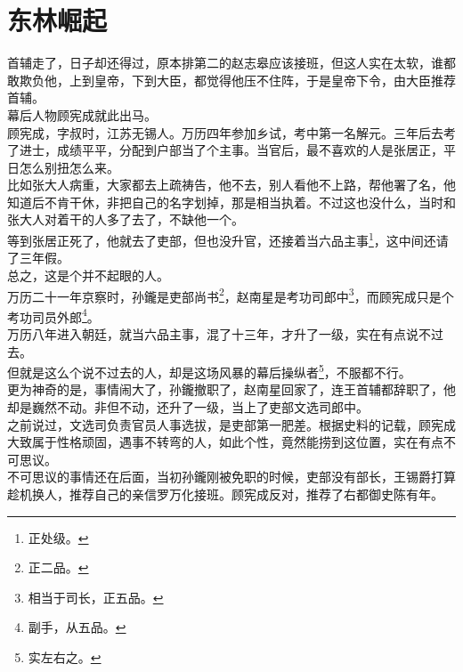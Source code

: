 \section{东林崛起}
\ifnum{}
	\begin{multicols}{\theparacolNo}
\fi
首辅走了，日子却还得过，原本排第二的赵志皋应该接班，但这人实在太软，谁都敢欺负他，上到皇帝，下到大臣，都觉得他压不住阵，于是皇帝下令，由大臣推荐首辅。\\

幕后人物顾宪成就此出马。\\

顾宪成，字叔时，江苏无锡人。万历四年参加乡试，考中第一名解元。三年后去考了进士，成绩平平，分配到户部当了个主事。当官后，最不喜欢的人是张居正，平日怎么别扭怎么来。\\

比如张大人病重，大家都去上疏祷告，他不去，别人看他不上路，帮他署了名，他知道后不肯干休，非把自己的名字划掉，那是相当执着。不过这也没什么，当时和张大人对着干的人多了去了，不缺他一个。\\

等到张居正死了，他就去了吏部，但也没升官，还接着当六品主事\footnote{正处级。}，这中间还请了三年假。\\

总之，这是个并不起眼的人。\\

万历二十一年京察时，孙鑨是吏部尚书\footnote{正二品。}，赵南星是考功司郎中\footnote{相当于司长，正五品。}，而顾宪成只是个考功司员外郎\footnote{副手，从五品。}。\\

万历八年进入朝廷，就当六品主事，混了十三年，才升了一级，实在有点说不过去。\\

但就是这么个说不过去的人，却是这场风暴的幕后操纵者\footnote{实左右之。}，不服都不行。\\

更为神奇的是，事情闹大了，孙鑨撤职了，赵南星回家了，连王首辅都辞职了，他却是巍然不动。非但不动，还升了一级，当上了吏部文选司郎中。\\

之前说过，文选司负责官员人事选拔，是吏部第一肥差。根据史料的记载，顾宪成大致属于性格顽固，遇事不转弯的人，如此个性，竟然能捞到这位置，实在有点不可思议。\\

不可思议的事情还在后面，当初孙鑨刚被免职的时候，吏部没有部长，王锡爵打算趁机换人，推荐自己的亲信罗万化接班。顾宪成反对，推荐了右都御史陈有年。\\


\end{multicols}
